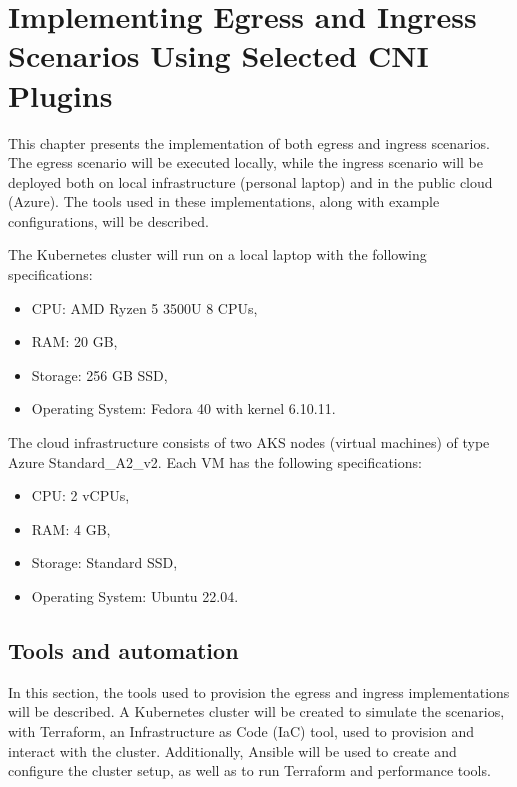 \chapter{Implementing Egress and Ingress Scenarios Using Selected CNI Plugins}
\label{cha:practical_impl}

This chapter presents the implementation of both egress and ingress scenarios. The egress scenario will be executed locally, while the ingress scenario will be deployed both on local infrastructure (personal laptop) and in the public cloud (Azure). The tools used in these implementations, along with example configurations, will be described.

The Kubernetes cluster will run on a local laptop with the following specifications:
\begin{itemize}
  \item CPU: AMD Ryzen 5 3500U 8 CPUs,
  \item RAM: 20 GB,
  \item Storage: 256 GB SSD,
  \item Operating System: Fedora 40 with kernel 6.10.11.
\end{itemize}

The cloud infrastructure consists of two AKS nodes (virtual machines) of type Azure Standard\_A2\_v2. Each VM has the following specifications:
\begin{itemize}
  \item CPU: 2 vCPUs,
  \item RAM: 4 GB,
  \item Storage: Standard SSD,
  \item Operating System: Ubuntu 22.04.
\end{itemize}






\section{Tools and automation}
\label{sec:tools}

In this section, the tools used to provision the egress and ingress implementations will be described. A Kubernetes cluster will be created to simulate the scenarios, with Terraform, an Infrastructure as Code (IaC) tool, used to provision and interact with the cluster. Additionally, Ansible will be used to create and configure the cluster setup, as well as to run Terraform and performance tools.


